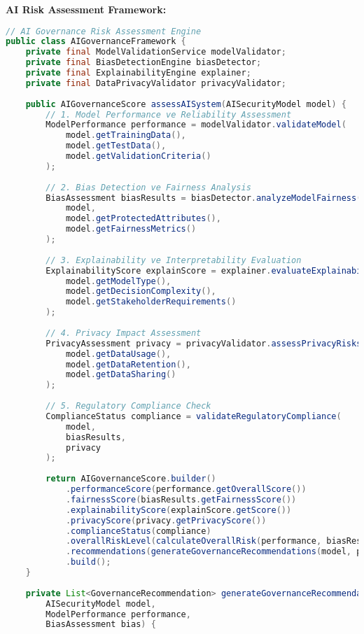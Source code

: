 \textbf{AI Risk Assessment Framework:}
\begin{lstlisting}[breaklines=true,basicstyle=\ttfamily\footnotesize,language=Java]
// AI Governance Risk Assessment Engine
public class AIGovernanceFramework {
    private final ModelValidationService modelValidator;
    private final BiasDetectionEngine biasDetector;
    private final ExplainabilityEngine explainer;
    private final DataPrivacyValidator privacyValidator;
    
    public AIGovernanceScore assessAISystem(AISecurityModel model) {
        // 1. Model Performance ve Reliability Assessment
        ModelPerformance performance = modelValidator.validateModel(
            model.getTrainingData(),
            model.getTestData(),
            model.getValidationCriteria()
        );
        
        // 2. Bias Detection ve Fairness Analysis
        BiasAssessment biasResults = biasDetector.analyzeModelFairness(
            model,
            model.getProtectedAttributes(),
            model.getFairnessMetrics()
        );
        
        // 3. Explainability ve Interpretability Evaluation
        ExplainabilityScore explainScore = explainer.evaluateExplainability(
            model.getModelType(),
            model.getDecisionComplexity(),
            model.getStakeholderRequirements()
        );
        
        // 4. Privacy Impact Assessment
        PrivacyAssessment privacy = privacyValidator.assessPrivacyRisks(
            model.getDataUsage(),
            model.getDataRetention(),
            model.getDataSharing()
        );
        
        // 5. Regulatory Compliance Check
        ComplianceStatus compliance = validateRegulatoryCompliance(
            model,
            biasResults,
            privacy
        );
        
        return AIGovernanceScore.builder()
            .performanceScore(performance.getOverallScore())
            .fairnessScore(biasResults.getFairnessScore())
            .explainabilityScore(explainScore.getScore())
            .privacyScore(privacy.getPrivacyScore())
            .complianceStatus(compliance)
            .overallRiskLevel(calculateOverallRisk(performance, biasResults, explainScore, privacy))
            .recommendations(generateGovernanceRecommendations(model, performance, biasResults))
            .build();
    }
    
    private List<GovernanceRecommendation> generateGovernanceRecommendations(
        AISecurityModel model,
        ModelPerformance performance,
        BiasAssessment bias) {
        

\end{lstlisting}

